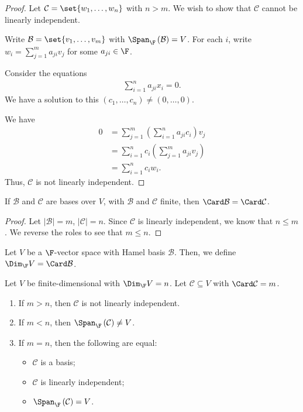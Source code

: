 \documentclass[10pt]{mypackage}
\begin{document}
\begin{proof}
  Let $\mathcal{C} = \set{w_1,\dots,w_n}$ with $n > m$. We wish to show that $\mathcal{C}$ cannot be linearly independent.\newline

  Write $\mathcal{B} = \set{v_1,\dots,v_m}$ with $\Span_{\F}\left(\mathcal{B}\right) = V$. For each $i$, write $w_i = \sum_{j=1}^{m}a_{ji}v_j$ for some $a_{ji}\in \F$.\newline

  Consider the equations
  \begin{align*}
    \sum_{i=1}^{n}a_{ji}x_i = 0.
  \end{align*}
  We have a solution to this $\left(c_1,\dots,c_n\right) \neq \left(0,\dots,0\right)$.\newline

  We have
  \begin{align*}
    0 &= \sum_{j=1}^{m} \left(\sum_{i=1}^{n}a_{ji}c_i\right)v_j\\
      &= \sum_{i=1}^{n}c_i\left(\sum_{j=1}^{m}a_{ji}v_j\right)\\
      &= \sum_{i=1}^{n}c_iw_i.
  \end{align*}
  Thus, $\mathcal{C}$ is not linearly independent.
\end{proof}
\begin{corollary}
  If $\mathcal{B}$ and $\mathcal{C}$ are bases over $V$, with $\mathcal{B}$ and $\mathcal{C}$ finite, then $\Card \mathcal{B} = \Card \mathcal{C}$.
\end{corollary}
\begin{proof}
  Let $|\mathcal{B}| = m$, $|\mathcal{C}| = n$. Since $\mathcal{C}$ is linearly independent, we know that $n\leq m$. We reverse the roles to see that $m\leq n$.
\end{proof}
\begin{definition}[Dimension]
  Let $V$ be a $\F$-vector space with Hamel basis $\mathcal{B}$. Then, we define $\Dim_{\F} V = \Card \mathcal{B}$.
\end{definition}
\begin{theorem}
  Let $V$ be finite-dimensional with $\Dim_{\F} V = n$. Let $\mathcal{C} \subseteq V$ with $\Card \mathcal{C} = m$.
  \begin{enumerate}[(1)]
    \item If $m > n$, then $\mathcal{C}$ is not linearly independent.
    \item If $m < n$, then $\Span_{\F}\left(\mathcal{C}\right) \neq V$.
    \item If $m = n$, then the following are equal:
      \begin{itemize}
        \item $\mathcal{C}$ is a basis;
        \item $\mathcal{C}$ is linearly independent;
        \item $\Span_{\F}\left(\mathcal{C}\right) = V$.
      \end{itemize}
  \end{enumerate}
\end{theorem}
\end{document}
